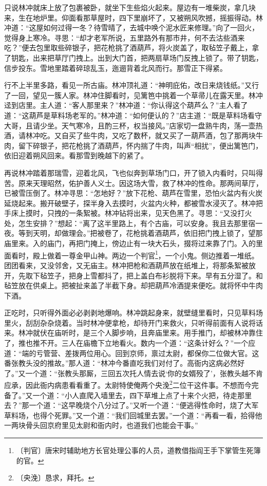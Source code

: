 \documentclass[12pt,UTF-8,openany]{ctexbook}
\begin{document}
\begin{large}
    只说林冲就床上放了包裹被卧，就坐下生些焰火起来。屋边有一堆柴炭，拿几块来，生在地炉里。仰面看那草屋时，四下里崩坏了，又被朔风吹撼，摇振得动。林冲道：“这屋如何过得一冬？待雪晴了，去城中唤个泥水匠来修理。”向了一回火，觉得身上寒冷。寻思：“却才老军所说，五里路外有那市井，何不去沽些酒来吃？”便去包里取些碎银子，把花枪挑了酒葫芦，将火炭盖了，取毡笠子戴上，拿了钥匙，出来把草厅门拽上。出到大门首，把两扇草场门反拽上锁了。带了钥匙，信步投东。雪地里踏着碎琼乱玉，迤逦背着北风而行。那雪正下得紧。
    
    行不上半里多路，看见一所古庙。林冲顶礼道：“神明庇佑，改日来烧钱纸。”又行了一回，望见一簇人家。林冲住脚看时，见篱笆中挑着一个草帚儿在露天里。林冲迳到店里。主人道：“客人那里来？”林冲道：“你认得这个葫芦么？”主人看了道：“这葫芦是草料场老军的。”林冲道：“如何便认的？”店主道：“既是草料场看守大哥，且请少坐。天气寒冷，且酌三杯，权当接风。”店家切一盘熟牛肉，荡一壶热酒，请林冲吃。又自买了些牛肉，又吃了数杯，就又买了一葫芦酒，包了那两块牛肉，留下碎银子，把花枪挑了酒葫芦，怀内揣了牛肉，叫声“相扰”，便出篱笆门，依旧迎着朔风回来。看那雪到晚越下的紧了。
    
    再说林冲踏着那瑞雪，迎着北风，飞也似奔到草场门口，开了锁入内看时，只叫得苦。原来天理昭然，佑护善人义士。因这场大雪，救了林冲的性命。那两间草厅，已被雪压倒了。林冲寻思：“怎地好？”放下花枪、葫芦在雪里，恐怕火盆内有火炭延烧起来。搬开破壁子，探半身入去摸时，火盆内火种，都被雪水浸灭了。林冲把手床上摸时，只拽的一条絮被。林冲钻将出来，见天色黑了。寻思：“又没打火处，怎生安排？”想起：“离了这半里路上，有个古庙，可以安身。我且去那里宿一夜。等到天明，却做理会。”把被卷了，花枪挑着酒葫芦，依旧把门拽上锁了，望那庙里来。入的庙门，再把门掩上，傍边止有一块大石头，掇将过来靠了门。入的里面看时，殿上做着一尊金甲山神。两边一个判官\footnote{〔判官〕唐宋时辅助地方长官处理公事的人员，道教借指阎王手下掌管生死簿的官。}，一个小鬼。侧边推着一堆纸。团团看来，又没邻舍，又无庙主。林冲把枪和酒葫芦放在纸堆上，将那条絮被放开，先取下毡笠子，把身上雪都抖了，把上盖白布衫脱将下来。早有五分湿了。和毡笠放在供桌上。把被扯来盖了半截下身。却把葫芦冷酒提来便吃。就将怀中牛肉下酒。
    
    正吃时，只听得外面必必剥剥地爆响。林冲跳起身来，就壁缝里看时，只见草料场里火，刮刮杂杂烧着。当时林冲便拿枪，却待开门来救火，只听得前面有人说将话来。林冲就伏在庙听时，是三个人脚步响，且奔庙里来。用手推门，却被林冲靠住了，推也推不开。三人在庙檐下立地看火。数内一个道：“这条计好么？”一个应道：“端的亏管营、差拨两位用心。回到京师，禀过太尉，都保你二位做大官。这番张教头没的推故。”那人道：“林冲今番直吃我们对付了。高衙内这病必然好了。”又一个道：“张教头那厮，三回五次托人情去说‘你的女婿殁了’，张教头越不肯应承，因此衙内病患看看重了。太尉特使俺两个央浼\footnote{〔央浼〕恳求，拜托。}二位干这件事。不想而今完备了。”又一个道：“小人直爬入墙里去，四下草堆上点了十来个火把，待走那里去？”那一个道：“这早晚烧个八分过了。”又听一个道：“便逃得性命时，烧了大军草料场，也得个死罪。”又一个道：“我们回城里去罢。”一个道：“再看一看，拾得他一两块骨头回京府里见太尉和衙内时，也道我们也能会干事。”
    

\end{large}
\end{document}
